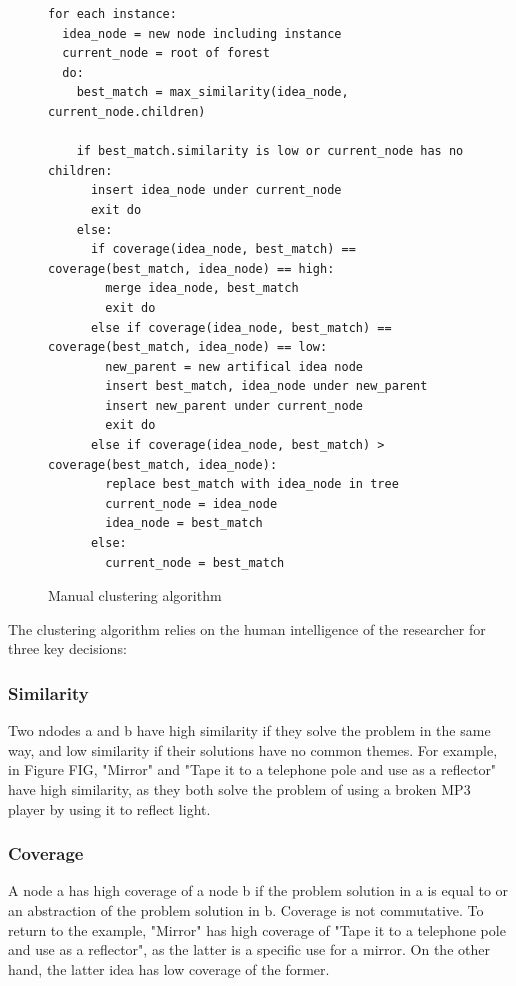 \begin{figure}[h!]
\small
\begin{verbatim}
for each instance:
  idea_node = new node including instance
  current_node = root of forest
  do:
    best_match = max_similarity(idea_node, current_node.children)

    if best_match.similarity is low or current_node has no children:
      insert idea_node under current_node
      exit do
    else:
      if coverage(idea_node, best_match) == coverage(best_match, idea_node) == high:
        merge idea_node, best_match
        exit do
      else if coverage(idea_node, best_match) == coverage(best_match, idea_node) == low:
        new_parent = new artifical idea node
        insert best_match, idea_node under new_parent
        insert new_parent under current_node
        exit do
      else if coverage(idea_node, best_match) > coverage(best_match, idea_node):
        replace best_match with idea_node in tree
        current_node = idea_node
        idea_node = best_match
      else:
        current_node = best_match
\end{verbatim}
\caption{Manual clustering algorithm}
\label{fig:cluseringalg}
\end{figure}

The clustering algorithm relies on the human intelligence of the researcher for three key decisions:

\subsubsection{Similarity}
Two ndodes a and b have high similarity if they solve the problem in the same way, and low similarity if their solutions have no common themes. For example, in Figure FIG, "Mirror" and "Tape it to a telephone pole and use as a reflector" have high similarity, as they both solve the problem of using a broken MP3 player by using it to reflect light.

\subsubsection{Coverage}
A node a has high coverage of a node b if the problem solution in a is equal to or an abstraction of the problem solution in b. Coverage is not commutative. To return to the example, "Mirror" has high coverage of "Tape it to a telephone pole and use as a reflector", as the latter is a specific use for a mirror. On the other hand, the latter idea has low coverage of the former.

